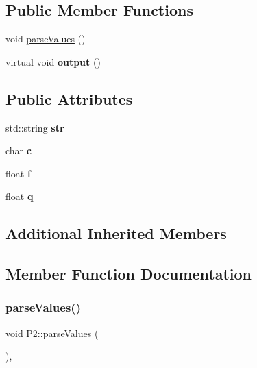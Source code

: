 \subsection*{Public Member Functions}
\begin{DoxyCompactItemize}
\item 
void \hyperlink{classP2_a3b8928a6e7dda94f06dab603420cd8c7}{parse\+Values} ()
\item 
\mbox{\label{classP2_a01f565d79b5c794b945ea2d9ecd92dbd}} 
virtual void {\bfseries output} ()
\end{DoxyCompactItemize}
\subsection*{Public Attributes}
\begin{DoxyCompactItemize}
\item 
\mbox{\label{classP2_ade6643522e8b3766a24c0e873283e5e0}} 
std\+::string {\bfseries str}
\item 
\mbox{\label{classP2_ada44448410a02423bfa909a90dfa9165}} 
char {\bfseries c}
\item 
\mbox{\label{classP2_acb53c80d81cd6e329182fc7ed051e4f7}} 
float {\bfseries f}
\item 
\mbox{\label{classP2_a29fe0aa9eaac637d3647f440a7cbb823}} 
float {\bfseries q}
\end{DoxyCompactItemize}
\subsection*{Additional Inherited Members}


\subsection{Member Function Documentation}
\mbox{\label{classP2_a3b8928a6e7dda94f06dab603420cd8c7}} 
\subsubsection{\texorpdfstring{parse\+Values()}{parseValues()}}
{\footnotesize\ttfamily void P2\+::parse\+Values (\begin{DoxyParamCaption}{ }\end{DoxyParamCaption})\hspace{0.3cm}{\ttfamily [inline]}, {\ttfamily [virtual]}}

